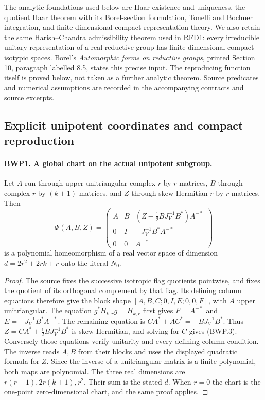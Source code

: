 \documentclass[11pt,a4paper]{article}
\numberwithin{equation}{section}
\theoremstyle{remark}\newtheorem{remark}[theorem]{Remark}
\begin{document}
The analytic foundations used below are Haar existence and uniqueness,
the quotient Haar theorem with its Borel-section formulation, Tonelli
and Bochner integration, and finite-dimensional compact representation
theory.  We also retain the same Harish--Chandra admissibility theorem
used in RFD1: every irreducible unitary representation of a real
reductive group has finite-dimensional compact isotypic spaces.
Borel's \emph{Automorphic forms on reductive groups}, printed
Section 10, paragraph labelled 8.5, states this precise input.
The reproducing function itself is proved below, not taken as a further
analytic theorem.  Source predicates and numerical assumptions are
recorded in the accompanying contracts and source excerpts.

\subsection{Explicit unipotent coordinates and compact reproduction}

\paragraph{BWP1. A global chart on the actual unipotent subgroup.}
\label{claim:BWP1}
Let \(A\) run through upper unitriangular complex \(r\)-by-\(r\)
matrices, \(B\) through complex \(r\)-by-\((k+1)\) matrices,
and \(Z\) through skew-Hermitian \(r\)-by-\(r\) matrices.
Then
\[
 \Phi(A,B,Z)=
 \begin{pmatrix}
 A&B&(Z-\tfrac12BJ_V^{-1}B^*)A^{-*}\\
 0&I&-J_V^{-1}B^*A^{-*}\\
 0&0&A^{-*}
 \end{pmatrix}
 \tag{BWP.3}
\]
is a polynomial homeomorphism of a real vector space of dimension
\(d=2r^2+2rk+r\) onto the literal \(N_0\).

\begin{proof}
The source fixes the successive isotropic flag quotients pointwise,
and fixes the quotient of its orthogonal complement by that flag.
Its defining column equations therefore give the block shape
\([A,B,C;0,I,E;0,0,F]\), with \(A\) upper unitriangular.
The equation \(g^*H_{k,r}g=H_{k,r}\) first gives
\(F=A^{-*}\) and \(E=-J_V^{-1}B^*A^{-*}\).
The remaining equation is
\(CA^*+AC^*=-BJ_V^{-1}B^*\).
Thus \(Z=CA^*+\tfrac12BJ_V^{-1}B^*\) is skew-Hermitian,
and solving for \(C\) gives (BWP.3).  Conversely those equations
verify unitarity and every defining column condition.
The inverse reads \(A,B\) from their blocks and uses the displayed
quadratic formula for \(Z\).  Since the inverse of a unitriangular
matrix is a finite polynomial, both maps are polynomial.
The three real dimensions are \(r(r-1),2r(k+1),r^2\).
Their sum is the stated \(d\).  When \(r=0\) the chart is the
one-point zero-dimensional chart, and the same proof applies.
\end{proof}
\end{document}
